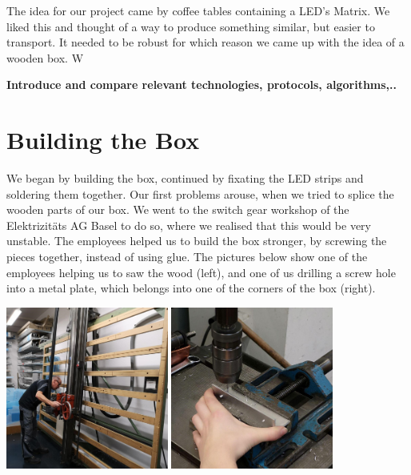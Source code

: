 \documentclass[a4paper,12pt]{article}
\begin{document}
 The idea for our project came by coffee tables containing a LED's Matrix. We liked this and thought of a way to produce something similar, but easier to transport.
 It needed to be robust for which reason we came up with the idea of a wooden box.
 W
 
 \textbf{Introduce and compare relevant technologies, protocols,
algorithms,..}

\section{Building the Box}
We began by building the box, continued by fixating the LED strips and soldering them together.
 Our first problems arouse, when we tried to splice the wooden parts of our box.
 We went to the switch gear workshop of the Elektrizitäts AG Basel to do so, where we realised that this would be very unstable.
 The employees helped us to build the box stronger, by screwing the pieces together, instead of using glue.
 The pictures below show one of the employees helping us to saw the wood (left), and one of us drilling a screw hole into a metal plate, which belongs into one of the corners of the box (right).
 
\vspace{1cm}

{ \centering
  \includegraphics[width = 0.4\textwidth]{brice.jpg}
  \space{   }
  \includegraphics[width = 0.4\textwidth]{bohren.jpg}
  \\}
 \vspace{1cm}
 
\end{document}
